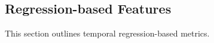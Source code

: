 \subsection{Regression-based Features}
\label{sec:regressionmetrics}

This section outlines temporal regression-based metrics.